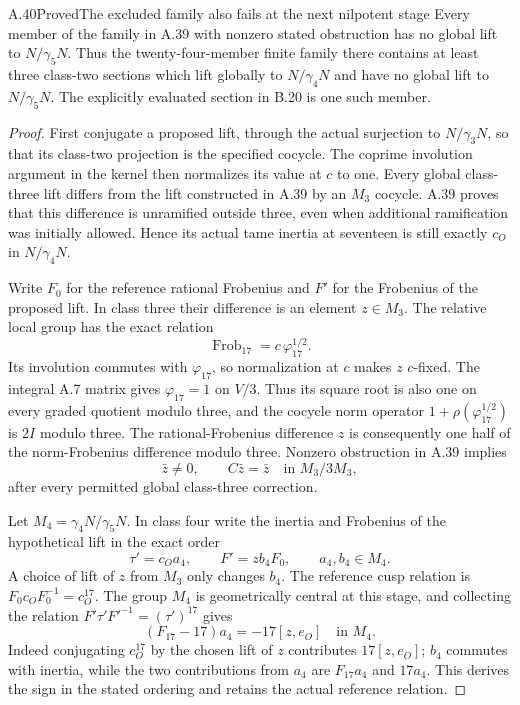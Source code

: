 \begin{statement}{A.40}{Proved}{The excluded family also fails at the next nilpotent stage}
Every member of the family in A.39 with nonzero stated
obstruction has no global lift to $N/\gamma_5N$. Thus the
twenty-four-member finite family there contains at least three
class-two sections which lift globally to $N/\gamma_4N$ and
have no global lift to $N/\gamma_5N$.
The explicitly evaluated section in B.20 is one such member.
\end{statement}
\begin{proof}
First conjugate a proposed lift, through the actual surjection
to $N/\gamma_3N$, so that its class-two projection is the
specified cocycle. The coprime involution argument in the
kernel then normalizes its value at $c$ to one. Every global
class-three lift differs from the lift constructed in A.39
by an $M_3$ cocycle. A.39 proves that this difference is
unramified outside three, even when additional ramification
was initially allowed. Hence its actual tame inertia at
seventeen is still exactly $c_O$ in $N/\gamma_4N$.

Write $F_0$ for the reference rational Frobenius and $F'$ for
the Frobenius of the proposed lift. In class three their
difference is an element $z\in M_3$. The relative local group
has the exact relation
\[
       \operatorname{Frob}_{17}=c\,\varphi_{17}^{1/2}.
 \tag{A.40.1}
\]
Its involution commutes with $\varphi_{17}$, so normalization
at $c$ makes $z$ $c$-fixed. The integral A.7 matrix gives
$\varphi_{17}=1$ on $V/3$. Thus its square root is also one
on every graded quotient modulo three, and the cocycle norm
operator $1+\rho(\varphi_{17}^{1/2})$ is $2I$ modulo three.
The rational-Frobenius difference $z$ is consequently one
half of the norm-Frobenius difference modulo three. Nonzero
obstruction in A.39 implies
\[
                 \bar z\ne0,\qquad C\bar z=\bar z
                       \quad\text{in }M_3/3M_3,
 \tag{A.40.2}
\]
after every permitted global class-three correction.

Let $M_4=\gamma_4N/\gamma_5N$. In class four write the inertia
and Frobenius of the hypothetical lift in the exact order
\[
             \tau'=c_Oa_4,\qquad F'=z b_4F_0,
                       \qquad a_4,b_4\in M_4.
 \tag{A.40.3}
\]
A choice of lift of $z$ from $M_3$ only changes $b_4$.
The reference cusp relation is $F_0c_OF_0^{-1}=c_O^{17}$.
The group $M_4$ is geometrically central at this stage, and
collecting the relation $F'\tau'F'^{-1}=(\tau')^{17}$ gives
\[
             (F_{17}-17)a_4=-17[z,e_O]\quad\text{in }M_4.
 \tag{A.40.4}
\]
Indeed conjugating $c_O^{17}$ by the chosen lift of $z$
contributes $17[z,e_O]$; $b_4$ commutes with inertia, while
the two contributions from $a_4$ are $F_{17}a_4$ and
$17a_4$. This derives the sign in the stated ordering and
retains the actual reference relation.


\end{proof}
